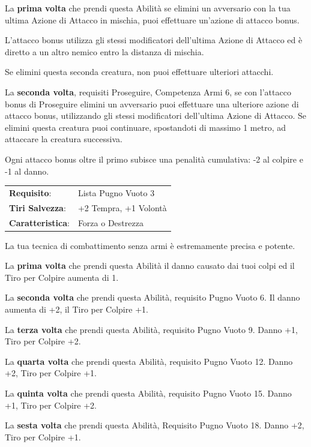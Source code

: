 \begin{multicols}{2}
La \textbf{prima volta} che prendi questa Abilità se elimini un avversario con la tua ultima Azione di Attacco in mischia, puoi effettuare un'azione di attacco bonus.

L'attacco bonus utilizza gli stessi modificatori dell'ultima Azione di Attacco ed è diretto a un altro nemico entro la distanza di mischia.

Se elimini questa seconda creatura, non puoi effettuare ulteriori attacchi.

La \textbf{seconda volta}, requisiti Proseguire, Competenza Armi 6, se con l'attacco bonus di Proseguire elimini un avversario puoi effettuare una ulteriore azione di attacco bonus, utilizzando gli stessi modificatori dell'ultima Azione di Attacco. Se elimini questa creatura puoi continuare, spostandoti di massimo 1 metro, ad attaccare la creatura successiva.

Ogni attacco bonus oltre il primo subisce una penalità cumulativa: -2 al colpire e -1 al danno.

\hspace{-0.2cm}\begin{tabularx}{\linewidth}{l@{\hspace{8pt}}X}
\rowcolor{gray!20}\textbf{Requisito}: & Lista Pugno Vuoto 3\\
\textbf{Tiri Salvezza}: & +2 Tempra, +1 Volontà\\
\rowcolor{gray!20}\textbf{Caratteristica}: & Forza o Destrezza\\
\end{tabularx}\smallskip

La tua tecnica di combattimento senza armi è estremamente precisa e potente.

La \textbf{prima volta} che prendi questa Abilità il danno causato dai tuoi colpi ed il Tiro per Colpire aumenta di 1.

La \textbf{seconda volta} che prendi questa Abilità, requisito Pugno Vuoto 6. Il danno aumenta di +2, il Tiro per Colpire +1.

La \textbf{terza volta} che prendi questa Abilità, requisito Pugno Vuoto 9. Danno +1, Tiro per Colpire +2.

La \textbf{quarta volta} che prendi questa Abilità, requisito Pugno Vuoto 12. Danno +2, Tiro per Colpire +1.

La \textbf{quinta volta} che prendi questa Abilità, requisito Pugno Vuoto 15. Danno +1, Tiro per Colpire +2.

La \textbf{sesta volta} che prendi questa Abilità, Requisito Pugno Vuoto 18. Danno +2, Tiro per Colpire +1.


\end{multicols}

